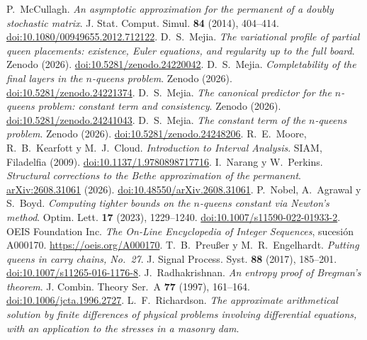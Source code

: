 P.~McCullagh.
\emph{An asymptotic approximation for the permanent of a doubly stochastic matrix}.
J. Stat. Comput. Simul. \textbf{84} (2014), 404--414.
\href{https://doi.org/10.1080/00949655.2012.712122}{doi:10.1080/00949655.2012.712122}.
 D.~S.~Mejia. \emph{The variational profile of partial queen placements: existence,
Euler equations, and regularity up to the full board}. Zenodo (2026).
\href{https://doi.org/10.5281/zenodo.24220042}{doi:10.5281/zenodo.24220042}.
 D.~S.~Mejia. \emph{Completability of the final layers in the $n$-queens problem}.
Zenodo (2026). \href{https://doi.org/10.5281/zenodo.24221374}{doi:10.5281/zenodo.24221374}.
 D.~S.~Mejia. \emph{The canonical predictor for the $n$-queens problem: constant term
and consistency}. Zenodo (2026).
\href{https://doi.org/10.5281/zenodo.24241043}{doi:10.5281/zenodo.24241043}.
 D.~S.~Mejia. \emph{The constant term of the $n$-queens problem}. Zenodo (2026).
\href{https://doi.org/10.5281/zenodo.24248206}{doi:10.5281/zenodo.24248206}.
\label{bib:moore}
R.~E.~Moore, R.~B.~Kearfott y M.~J.~Cloud.
\emph{Introduction to Interval Analysis}.
SIAM, Filadelfia (2009).
\href{https://doi.org/10.1137/1.9780898717716}{doi:10.1137/1.9780898717716}.
I.~Narang y W.~Perkins.
\emph{Structural corrections to the Bethe approximation of the permanent}.
\href{https://arxiv.org/abs/2608.31061}{arXiv:2608.31061} (2026).
\href{https://doi.org/10.48550/arXiv.2608.31061}{doi:10.48550/arXiv.2608.31061}.
P.~Nobel, A.~Agrawal y S.~Boyd.
\emph{Computing tighter bounds on the $n$-queens constant via Newton's method}.
Optim. Lett. \textbf{17} (2023), 1229--1240.
\href{https://doi.org/10.1007/s11590-022-01933-2}{doi:10.1007/s11590-022-01933-2}.
OEIS Foundation Inc.
\emph{The On-Line Encyclopedia of Integer Sequences}, sucesión A000170.
\url{https://oeis.org/A000170}.
T.~B.~Preußer y M.~R.~Engelhardt.
\emph{Putting queens in carry chains, No.~27}.
J. Signal Process. Syst. \textbf{88} (2017), 185--201.
\href{https://doi.org/10.1007/s11265-016-1176-8}{doi:10.1007/s11265-016-1176-8}.
J.~Radhakrishnan.
\emph{An entropy proof of Bregman's theorem}.
J. Combin. Theory Ser.~A \textbf{77} (1997), 161--164.
\href{https://doi.org/10.1006/jcta.1996.2727}{doi:10.1006/jcta.1996.2727}.
L.~F.~Richardson.
\emph{The approximate arithmetical solution by finite differences of physical problems involving
differential equations, with an application to the stresses in a masonry dam}.
